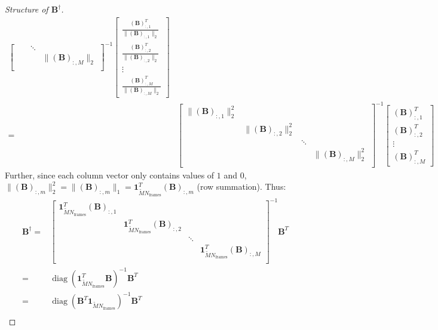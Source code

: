 \documentclass[11pt]{article}
\begin{document}
\begin{proof}[Structure of $\mathbf{B}^\dagger$]
\begin{equation*}
\begin{aligned}
\begin{bmatrix}
            & & \ddots \\
            & & & \|(\mathbf{B})_{:,M}\|_2 \\
            \end{bmatrix}^{-1}
            \begin{bmatrix} \frac{(\mathbf{B})_{:,1}^T}{\|(\mathbf{B})_{:,1}\|_2} \\ \frac{(\mathbf{B})_{:,2}^T}{\|(\mathbf{B})_{:,2}\|_2} \\ \vdots \\ \frac{(\mathbf{B})_{:,M}^T}{\|(\mathbf{B})_{:,M}\|_2} \end{bmatrix}
            \\
            = & 
            \begin{bmatrix}
            \|(\mathbf{B})_{:,1}\|^2_2 \\
            & \|(\mathbf{B})_{:,2}\|^2_2 \\
            & & \ddots \\
            & & & \|(\mathbf{B})_{:,M}\|^2_2 \\
            \end{bmatrix}^{-1}
            \begin{bmatrix} (\mathbf{B})_{:,1}^T \\ (\mathbf{B})_{:,2}^T \\ \vdots \\ (\mathbf{B})_{:,M}^T \end{bmatrix}
        \end{aligned}
    \end{equation*}
    Further, since each column vector only contains values of $1$ and $0$, $\|(\mathbf{B})_{:,m}\|_2^2 = \|(\mathbf{B})_{:,m}\|_1 = \mathbf{1}_{\tilde{M}N_\mathrm{frames}}^T(\mathbf{B})_{:,m}$ (row summation).
    Thus:
    \begin{equation*}
        \begin{aligned}
            \mathbf{B}^\dagger =& 
            \begin{bmatrix}
            \mathbf{1}_{\tilde{M}N_\mathrm{frames}}^T(\mathbf{B})_{:,1} \\
            & \mathbf{1}_{\tilde{M}N_\mathrm{frames}}^T(\mathbf{B})_{:,2} \\
            & & \ddots \\
            & & & \mathbf{1}_{\tilde{M}N_\mathrm{frames}}^T(\mathbf{B})_{:,M} \\
            \end{bmatrix}^{-1}
            \mathbf{B}^T \\
            = &
            \operatorname{diag} \left(\mathbf{1}_{\tilde{M}N_\mathrm{frames}}^T\mathbf{B}
            \right)^{-1}  \mathbf{B}^T \\
            = &
            \operatorname{diag} \left(\mathbf{B}^T\mathbf{1}_{\tilde{M}N_\mathrm{frames}}\right)^{-1} \mathbf{B}^T \\
        \end{aligned}
    \end{equation*}

\end{proof}
\end{document}
